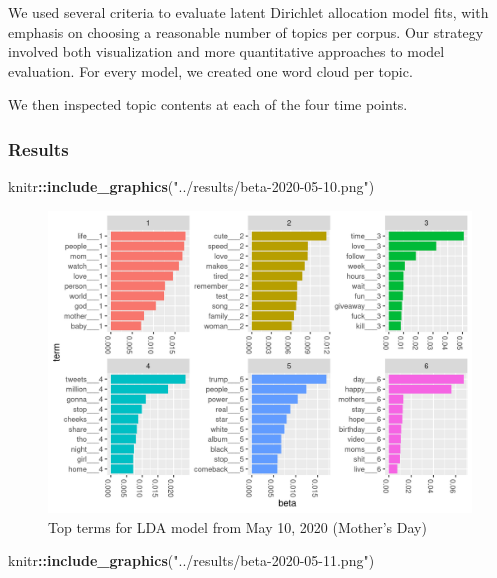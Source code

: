 \documentclass[
]{article}
\newenvironment{Shaded}{\begin{snugshade}}{\end{snugshade}}
\newcommand{\KeywordTok}[1]{\textcolor[rgb]{0.13,0.29,0.53}{\textbf{#1}}}
\newcommand{\NormalTok}[1]{#1}
\newcommand{\OperatorTok}[1]{\textcolor[rgb]{0.81,0.36,0.00}{\textbf{#1}}}
\newcommand{\StringTok}[1]{\textcolor[rgb]{0.31,0.60,0.02}{#1}}
\begin{document}
We used several criteria to evaluate latent Dirichlet allocation model
fits, with emphasis on choosing a reasonable number of topics per
corpus. Our strategy involved both visualization and more quantitative
approaches to model evaluation. For every model, we created one word
cloud per topic.

We then inspected topic contents at each of the four time points.

\hypertarget{results}{%
\subsubsection{Results}\label{results}}

\begin{Shaded}
\begin{Highlighting}[]
\NormalTok{knitr}\OperatorTok{::}\KeywordTok{include_graphics}\NormalTok{(}\StringTok{"../results/beta-2020-05-10.png"}\NormalTok{)}
\end{Highlighting}
\end{Shaded}

\begin{figure}
\includegraphics[width=29.17in]{../results/beta-2020-05-10} \caption{Top terms for LDA model from May 10, 2020 (Mother's Day)}\label{fig:unnamed-chunk-5}
\end{figure}

\begin{Shaded}
\begin{Highlighting}[]
\NormalTok{knitr}\OperatorTok{::}\KeywordTok{include_graphics}\NormalTok{(}\StringTok{"../results/beta-2020-05-11.png"}\NormalTok{)}
\end{Highlighting}
\end{Shaded}
\end{document}
